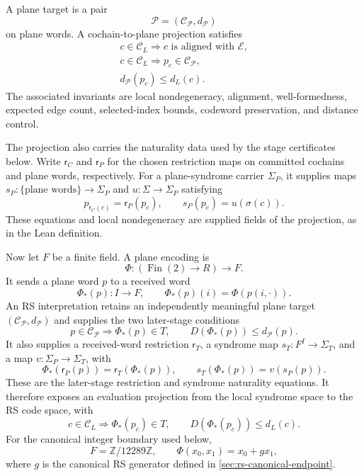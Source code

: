 A plane target is a pair
\[
  \mathcal P=(\mathcal C_{\mathcal P},d_{\mathcal P})
\]
on plane words. A cochain-to-plane projection satisfies
\[
\begin{gathered}
  c\in\mathcal C_L\Longrightarrow c\text{ is aligned with }\mathcal E,\\
  c\in\mathcal C_L\Longrightarrow
    p_c\in\mathcal C_{\mathcal P},\\
  d_{\mathcal P}(p_c)\le d_L(c).
\end{gathered}
\]
The associated invariants are local nondegeneracy, alignment,
well-formedness, expected edge count, selected-index bounds, codeword
preservation, and distance control.

The projection also carries the naturality data used by the stage
certificates below. Write \(\mathsf r_C\) and \(\mathsf r_P\) for the
chosen restriction maps on committed cochains and plane words, respectively.
For a plane-syndrome carrier \(\Sigma_P\), it supplies maps
\(s_P:\{\text{plane words}\}\to\Sigma_P\) and
\(u:\Sigma\to\Sigma_P\) satisfying
\[
  p_{\mathsf r_C(c)}=\mathsf r_P(p_c),
  \qquad
  s_P(p_c)=u(\sigma(c)).
\]
These equations and local nondegeneracy are supplied fields of the
projection, as in the Lean definition.

Now let \(F\) be a finite field. A plane encoding is
\[
  \Phi:(\operatorname{Fin}(2)\to R)\to F.
\]
It sends a plane word \(p\) to a received word
\[
  \Phi_\ast(p):I\to F,\qquad
  \Phi_\ast(p)(i)=\Phi(p(i,\cdot)).
\]
An RS interpretation retains an independently meaningful plane target
\((\mathcal C_{\mathcal P},d_{\mathcal P})\) and supplies the two later-stage
conditions
\[
  p\in\mathcal C_{\mathcal P}
  \Longrightarrow
  \Phi_\ast(p)\in T,
  \qquad
  D(\Phi_\ast(p))\le d_{\mathcal P}(p).
\]
It also supplies a received-word restriction \(\mathsf r_T\), a syndrome
map \(s_T:F^I\to\Sigma_T\), and a map
\(v:\Sigma_P\to\Sigma_T\), with
\[
  \Phi_\ast(\mathsf r_P(p))=\mathsf r_T(\Phi_\ast(p)),
  \qquad
  s_T(\Phi_\ast(p))=v(s_P(p)).
\]
These are the later-stage restriction and syndrome naturality equations.
It therefore exposes an evaluation projection from the local syndrome space
to the RS code space, with
\[
  c\in\mathcal C_L
  \Longrightarrow
  \Phi_\ast(p_c)\in T,
  \qquad
  D(\Phi_\ast(p_c))\le d_L(c).
\]
For the canonical integer boundary used below,
\[
  F=\mathbb Z/12289\mathbb Z,\qquad
  \Phi(x_0,x_1)=x_0+g x_1,
\]
where \(g\) is the canonical RS generator defined in
\cref{sec:rs-canonical-endpoint}.

